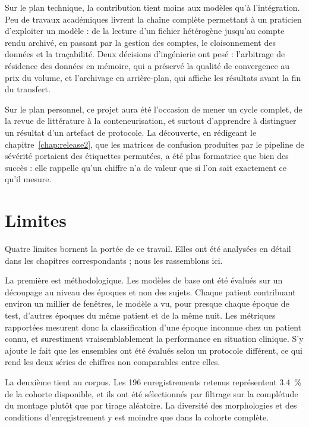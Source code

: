 Sur le plan technique, la contribution tient moins aux modèles qu'à
l'intégration. Peu de travaux académiques livrent la chaîne complète permettant à un
praticien d'exploiter un modèle : de la lecture d'un fichier hétérogène jusqu'au compte
rendu archivé, en passant par la gestion des comptes, le cloisonnement des données et
la traçabilité. Deux décisions d'ingénierie ont pesé : l'arbitrage de
résidence des données en mémoire, qui a préservé la qualité de convergence au prix du
volume, et l'archivage en arrière-plan, qui affiche les résultats avant la fin du
transfert.

Sur le plan personnel, ce projet aura été l'occasion de mener un cycle complet,
de la revue de littérature à la conteneurisation, et surtout d'apprendre à
distinguer un résultat d'un artefact de protocole. La découverte, en rédigeant le
chapitre~\ref{chap:release2}, que les matrices de confusion produites par le
pipeline de sévérité portaient des étiquettes permutées, a été plus formatrice que bien
des succès : elle rappelle qu'un chiffre n'a de valeur que si l'on sait exactement ce
qu'il mesure.

\section*{Limites}

Quatre limites bornent la portée de ce travail. Elles ont été analysées en détail dans
les chapitres correspondants ; nous les rassemblons ici.

La première est méthodologique. Les modèles de base ont été évalués sur un
découpage au niveau des époques et non des sujets. Chaque patient contribuant environ un
millier de fenêtres, le modèle a vu, pour presque chaque époque de test, d'autres
époques du même patient et de la même nuit. Les métriques rapportées mesurent donc la
classification d'une époque inconnue chez un patient connu, et surestiment
vraisemblablement la performance en situation clinique. S'y ajoute le fait que les
ensembles ont été évalués selon un protocole différent, ce qui rend les deux séries de
chiffres non comparables entre elles.

La deuxième tient au corpus. Les 196 enregistrements retenus représentent
\SI{3,4}{\percent} de la cohorte disponible, et ils ont été sélectionnés par filtrage
sur la complétude du montage plutôt que par tirage aléatoire. La diversité des
morphologies et des conditions d'enregistrement y est moindre que dans la cohorte
complète.

